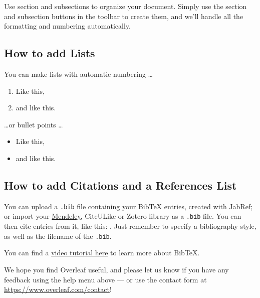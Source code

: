 \documentclass[a4paper]{article}
\begin{document}
Use section and subsections to organize your document. Simply use the section and subsection buttons in the toolbar to create them, and we'll handle all the formatting and numbering automatically.

\subsection{How to add Lists}

You can make lists with automatic numbering \dots

\begin{enumerate}
\item Like this,
\item and like this.
\end{enumerate}
\dots or bullet points \dots
\begin{itemize}
\item Like this,
\item and like this.
\end{itemize}

\subsection{How to add Citations and a References List}

You can upload a \verb|.bib| file containing your BibTeX entries, created with JabRef; or import your \href{https://www.overleaf.com/blog/184}{Mendeley}, CiteULike or Zotero library as a \verb|.bib| file. You can then cite entries from it, like this: \cite{greenwade93}. Just remember to specify a bibliography style, as well as the filename of the \verb|.bib|.

You can find a \href{https://www.overleaf.com/help/97-how-to-include-a-bibliography-using-bibtex}{video tutorial here} to learn more about BibTeX.

We hope you find Overleaf useful, and please let us know if you have any feedback using the help menu above --- or use the contact form at \url{https://www.overleaf.com/contact}!



\end{document}
